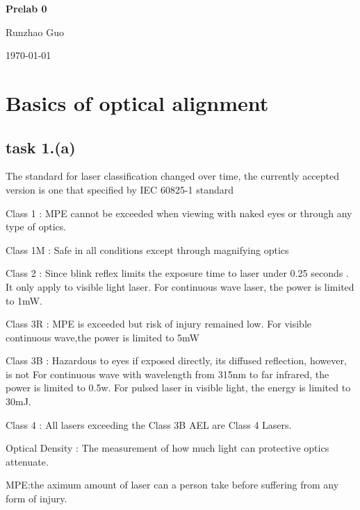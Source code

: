 \documentclass{article}
\begin{document}
\begin{titlepage}
    \centering
    \vspace*{6cm} %
    {\Huge \textbf{Prelab 0}} \par
    \vspace*{1cm}
    {\Large Runzhao Guo} \par
    \vspace*{1cm}
    {\Large \today} \par
    \vspace*{2cm}
\end{titlepage}

\section{Basics of optical alignment}

\subsection{task 1.(a)}
{The standard for laser classification changed over time, the currently accepted version is one that 
specified by IEC 60825-1 standard}\par
{Class 1 : MPE cannot be exceeded when viewing with naked eyes or through any type of optics.}\par
{Class 1M : Safe in all conditions except through magnifying optics}\par
{Class 2 : Since blink reflex limits the exposure time to laser under 0.25 seconds
\cite{enwiki:1248185910}. It only apply to visible light laser. For continuous wave laser, the power
 is limited to 1mW.}\par
{Class 3R : MPE is exceeded but risk of injury remained low. For visible continuous wave,the power 
is limited to 5mW}\par
{Class 3B : Hazardous to eyes if exposed directly, its diffused reflection, however, is not
For continuous wave with wavelength from 315nm to far infrared, the power is limited to 0.5w. For pulsed 
laser in visible light, the energy is limited to 30mJ.}\par
{Class 4 : All lasers exceeding the Class 3B AEL are Class 4 Lasers.}\par
{Optical Density : The measurement of how much light can protective optics attenuate.}\par
{MPE:the aximum amount of laser can a person take before suffering from any form of injury.}\par
\end{document}
